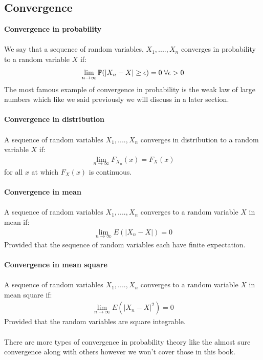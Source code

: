 \documentclass[,oneside]{article}
\begin{document}
\begin{enumerate}
\subsection{Convergence}
\textbf{Convergence in probability}\\ \\
We say that a sequence of random variables, $X_1,....,X_n$ converges in probability to a random variable $X$ if:
\begin{align*}
 \lim_{n \to \infty} \mathbb{P}(|X_n-X| \geq \epsilon) = 0  \hspace{0.1cm} \forall \epsilon > 0
\end{align*}
The most famous example of convergence in probability is the weak law of large numbers which like we said previously we will discuss in a later section.\\ \\
\textbf{Convergence in distribution}\\ \\
A sequence of random variables $X_1,....,X_n$ converges in distribution to a random variable $X$ if:
\begin{align*}
\lim_{n \to \infty} F_{X_n} (x) = F_X(x)
\end{align*}
for all $x$ at which $F_X(x)$ is continuous.\\ \\
\textbf{Convergence in mean}\\ \\
A sequence of random variables $X_1,....,X_n$ converges to a random variable $X$ in mean if:
\begin{align*}
\lim_{n \to \infty} E(|X_n - X|)=0
\end{align*}
Provided that the sequence of random variables each have finite expectation.\\ \\
\textbf{Convergence in mean square}\\ \\
A sequence of random variables $X_1,....,X_n$ converges to a random variable $X$ in mean square if:
\begin{align*}
\lim_{n \to \infty} E(|X_n - X|^2)=0
\end{align*}
Provided that the random variables are square integrable.\\ \\
There are more types of convergence in probability theory like the almost sure convergence along with others however we won't cover those in this book.\\ \\

\end{enumerate}
\end{document}
